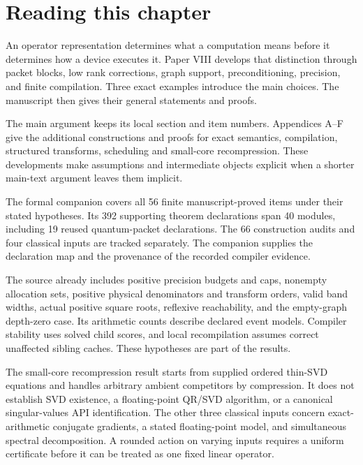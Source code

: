 \documentclass[11pt,letterpaper]{article}
\theoremstyle{definition}
\theoremstyle{remark}
\begin{document}
\KomorebiCover
{}

\section*{Reading this chapter}
An operator representation determines what a computation means before it determines how a device executes it. Paper VIII develops that distinction through packet blocks, low rank corrections, graph support, preconditioning, precision, and finite compilation. Three exact examples introduce the main choices. The manuscript then gives their general statements and proofs.

The main argument keeps its local section and item numbers. Appendices A--F give the additional constructions and proofs for exact semantics, compilation, structured transforms, scheduling and small-core recompression. These developments make assumptions and intermediate objects explicit when a shorter main-text argument leaves them implicit.

The formal companion covers all 56 finite manuscript-proved items under their stated hypotheses. Its 392 supporting theorem declarations span 40 modules, including 19 reused quantum-packet declarations. The 66 construction audits and four classical inputs are tracked separately. The companion supplies the declaration map and the provenance of the recorded compiler evidence.

The source already includes positive precision budgets and caps, nonempty allocation sets, positive physical denominators and transform orders, valid band widths, actual positive square roots, reflexive reachability, and the empty-graph depth-zero case. Its arithmetic counts describe declared event models. Compiler stability uses solved child scores, and local recompilation assumes correct unaffected sibling caches. These hypotheses are part of the results.

The small-core recompression result starts from supplied ordered thin-SVD equations and handles arbitrary ambient competitors by compression. It does not establish SVD existence, a floating-point QR/SVD algorithm, or a canonical singular-values API identification. The other three classical inputs concern exact-arithmetic conjugate gradients, a stated floating-point model, and simultaneous spectral decomposition. A rounded action on varying inputs requires a uniform certificate before it can be treated as one fixed linear operator.
\end{document}
